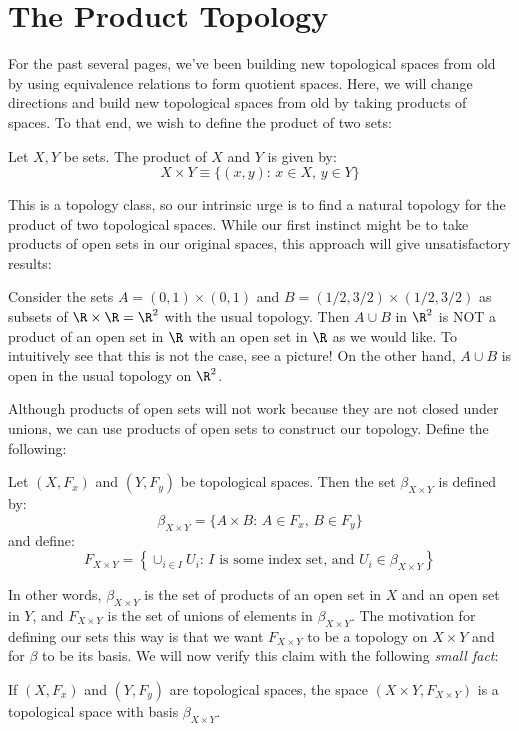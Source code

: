 \section{The Product Topology}

 For the past several pages, we've been building new topological spaces from old by using equivalence relations to form quotient spaces.  Here, we will change directions and build new topological spaces from old by taking products of spaces. To that end, we wish to define the product of two sets:
\begin{definition}
Let $X,Y$ be sets. The product of $X$ and $Y$ is given by:
\[X\times Y \equiv \{(x,y):\,x\in X,\,y\in Y\}\]
\end{definition}
This is a topology class, so our intrinsic urge is to find a natural topology for the product of two topological spaces. While our first instinct might be to take products of open sets in our original spaces, this approach will give unsatisfactory results:
\begin{example}
Consider the sets $A = (0,1)\times (0,1)$ and $B = (1/2,3/2)\times(1/2,3/2)$ as subsets of $\R\times\R = \R^2$ with the usual topology. Then $A\cup B$ in $\R^2$ is NOT a product of an open set in $\R$ with an open set in $\R$ as we would like. To intuitively see that this is not the case, see a picture! On the other hand, $A\cup B$ is open in the usual topology on $\R^2$.
\end{example}

\placeholder

Although products of open sets will not work because they are not closed under unions, we can use products of open sets to construct our topology. Define the following:
\begin{definition}
Let $(X,F_x)$ and $(Y,F_y)$ be topological spaces. Then the set $\beta_{X\times Y}$ is defined by:
\[\beta_{X\times Y} = \{A\times B:\,A\in F_x,\,B\in F_y\}\]
and define:
\[F_{X\times Y} = \left\{\cup_{i\in I} U_i:\,I \text{ is some index set, and }U_i\in \beta_{X\times Y}\right\}\]
\end{definition}
In other words, $\beta_{X\times Y}$ is the set of products of an open set in $X$ and an open set in $Y$, and $F_{X\times Y}$ is the set of unions of elements in $\beta_{X\times Y}$. The motivation for defining our sets this way is that we want $F_{X\times Y}$ to be a topology on $X\times Y$ and for $\beta$ to be its basis. We will now verify this claim with the following \emph{small fact}:
\begin{theorem}
If $(X,F_x)$ and $(Y,F_y)$ are topological spaces, the space $(X\times Y,F_{X\times Y})$ is a topological space with basis $\beta_{X\times Y}$.
\end{theorem}

